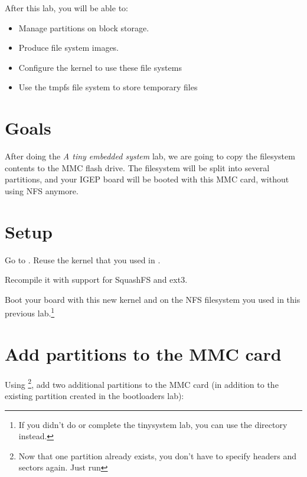
After this lab, you will be able to:
\begin{itemize}
\item Manage partitions on block storage.
\item Produce file system images.
\item Configure the kernel to use these file systems
\item Use the tmpfs file system to store temporary files
\end{itemize}

\section{Goals}

After doing the {\em A tiny embedded system} lab, we are going to copy
the filesystem contents to the MMC flash drive. The filesystem will be
split into several partitions, and your IGEP board will be booted with
this MMC card, without using NFS anymore.

\section{Setup}

Go to . Reuse the kernel that you
used in .

Recompile it with support for SquashFS and ext3.

Boot your board with this new kernel and on the NFS filesystem you
used in this previous lab.\footnote{If you didn't do or complete the
  tinysystem lab, you can use the  directory instead.}

\section{Add partitions to the MMC card}

Using 
\footnote{Now that one partition already exists, you don't have to specify
headers and sectors again. Just run },
add two additional partitions to the MMC card (in
addition to the existing  partition created in the
bootloaders lab):

